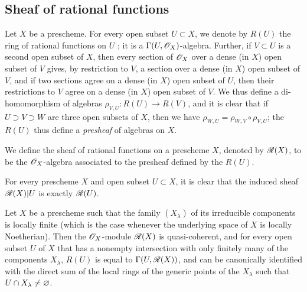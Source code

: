 \subsection{Sheaf of rational functions}
\label{subsection-sheaf-of-rational-functions}

\begin{env}[7.3.1]
\label{1.7.3.1}
Let $X$ be a prescheme.
For every open subset $U\subset X$, we denote by $R(U)$ the ring of rational functions on $U$ ; it is a $\Gamma(U,\mathscr{O}_X)$-algebra.
Further, if $V\subset U$ is a second open subset of $X$, then every section of $\mathscr{O}_X$ over a dense (in $X$) open subset of $V$ gives, by restriction to $V$, a section over a dense (in $X$) open subset of $V$, and if two sections agree on a dense (in $X$) open subset of $U$, then their restrictions to $V$ agree on a dense (in $X$) open subset of $V$.
We thus define a di-homomorphism of algebras $\rho_{V,U}\colon R(U)\to R(V)$, and it is clear that if $U\supset V\supset W$ are three open subsets of $X$, then we have $\rho_{W,U}=\rho_{W,V}\circ\rho_{V,U}$; the $R(U)$ thus define a \emph{presheaf} of algebras on $X$.
\end{env}

\begin{defn}[7.3.2]
\label{1.7.3.2}
We define the sheaf of rational functions on a prescheme $X$, denoted by $\mathscr{R}(X)$, to be the $\mathscr{O}_X$-algebra associated to the presheaf defined by the $R(U)$.
\end{defn}

For every prescheme $X$ and open subset $U\subset X$, it is clear that the induced sheaf $\mathscr{R}(X)|U$ is exactly $\mathscr{R}(U)$.

\begin{prop}[7.3.3]
\label{1.7.3.3}
Let $X$ be a prescheme such that the family $(X_\lambda)$ of its irreducible components is locally finite (which is the case whenever the underlying space of $X$ is locally Noetherian).
Then the $\mathscr{O}_X$-module $\mathscr{R}(X)$ is quasi-coherent, and for every open subset $U$ of $X$ that has a nonempty intersection with only finitely many of the components $X_\lambda$, $R(U)$ is equal to $\Gamma(U,\mathscr{R}(X))$, and can be canonically identified with the direct sum of the local rings of the generic points of the $X_\lambda$ such that $U\cap X_\lambda\neq\varnothing$.
\end{prop}

